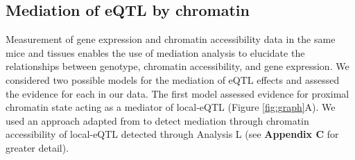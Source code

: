 \documentclass[9pt,twocolumn,twoside]{gsajnl}
\begin{document}

\subsection{Mediation of eQTL by chromatin}

Measurement of gene expression and chromatin accessibility data in the same mice and tissues enables the use of mediation analysis to elucidate the relationships between genotype, chromatin accessibility, and gene expression. 
We considered two possible models for the mediation of eQTL effects and assessed the evidence for each in our data.
The first model assessed evidence for proximal chromatin state acting as a mediator of local-eQTL (Figure \ref{fig:graph}A). We used an approach adapted from \cite{Chick2016} to detect mediation through chromatin accessibility of local-eQTL detected through Analysis L (see \textbf{Appendix C} for greater detail).  
\end{document}
